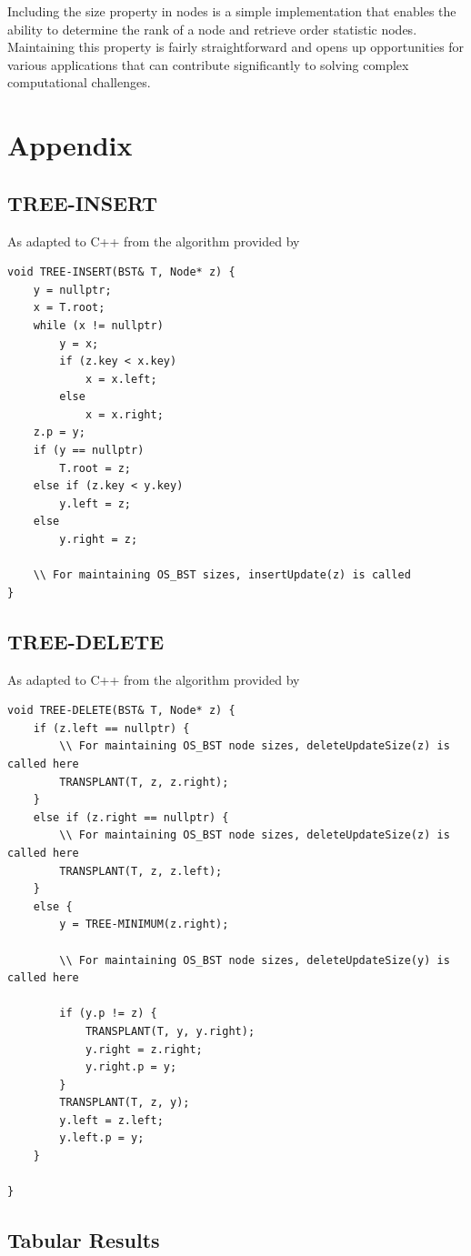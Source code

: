 \documentclass[a4paper,twoside,12pt]{report}
\begin{document}
Including the size property in nodes is a simple implementation that enables the ability to determine the rank of a node and retrieve order statistic nodes. Maintaining this property is fairly straightforward and opens up opportunities for various applications that can contribute significantly to solving complex computational challenges.


\appendix
\chapter{Appendix}\label{app:extra}


\section{TREE-INSERT}\label{app:tree-insert}
As adapted to C++ from the algorithm provided by \citet{Cormen2009}
\begin{lstlisting}[style=mystyle]
void TREE-INSERT(BST& T, Node* z) {
	y = nullptr;
	x = T.root;
	while (x != nullptr)
		y = x;
		if (z.key < x.key)
			x = x.left;
		else 
			x = x.right;
	z.p = y;
	if (y == nullptr)
		T.root = z;
	else if (z.key < y.key)
		y.left = z;
	else 
		y.right = z;
		
	\\ For maintaining OS_BST sizes, insertUpdate(z) is called
}
\end{lstlisting}

\newpage
\section{TREE-DELETE}\label{app:tree-delete}
As adapted to C++ from the algorithm provided by \citet{Cormen2009}
\begin{lstlisting}[style=mystyle]
void TREE-DELETE(BST& T, Node* z) {
	if (z.left == nullptr) {
		\\ For maintaining OS_BST node sizes, deleteUpdateSize(z) is called here
		TRANSPLANT(T, z, z.right);
	}
	else if (z.right == nullptr) {
		\\ For maintaining OS_BST node sizes, deleteUpdateSize(z) is called here
		TRANSPLANT(T, z, z.left);
	}
	else {
		y = TREE-MINIMUM(z.right);
		
		\\ For maintaining OS_BST node sizes, deleteUpdateSize(y) is called here
		
		if (y.p != z) {
			TRANSPLANT(T, y, y.right);
			y.right = z.right;
			y.right.p = y;
		}
		TRANSPLANT(T, z, y);
		y.left = z.left;
		y.left.p = y;
	}
	
}
\end{lstlisting}

\listoftables
\section{Tabular Results}\label{tab:results}


\nocite{*}

\end{document}
